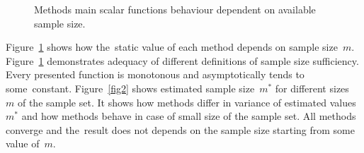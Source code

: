 \documentclass[
11pt,%
tightenlines,%
twoside,%
onecolumn,%
nofloats,%
nobibnotes,%
nofootinbib,%
superscriptaddress,%
noshowpacs,%
centertags]%
{revtex4}
\begin{document}
\begin{figure}[h!]
\caption{Methods main scalar functions behaviour dependent on available sample size.}
\label{fig1}
\end{figure}

Figure~\ref{fig1} shows how the~static value of each method depends on sample size~$m$. %
Figure~\ref{fig1} demonstrates adequacy of different definitions of sample size sufficiency. Every presented function is monotonous and asymptotically tends to some~constant. Figure~\ref{fig2} shows estimated sample size~$m^*$ for  different sizes~$m$ of the sample set. It shows how methods differ in variance  of estimated values~$m^*$ and how methods behave in case of small size of the sample set. All methods converge and the~result does not depends on the sample size starting from some value of~$m$. 
\end{document}
